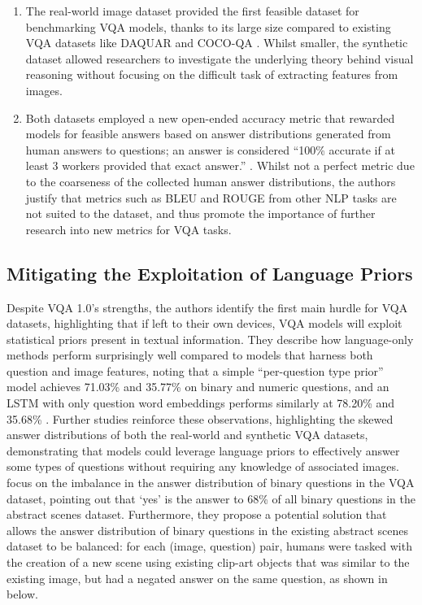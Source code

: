 \begin{enumerate}
    \item The real-world image dataset provided the first feasible dataset for benchmarking VQA models, thanks to its large size compared to existing VQA datasets like DAQUAR \cite{malinowski2014multiworld} and COCO-QA \cite{ren2015exploring}. Whilst smaller, the synthetic dataset allowed researchers to investigate the underlying theory behind visual reasoning without focusing on the difficult task of extracting features from images.
    \item Both datasets employed a new open-ended accuracy metric that rewarded models for feasible answers based on answer distributions generated from human answers to questions; an answer is considered ``100\% accurate if at least 3 workers provided that exact answer.'' \citeauthor{antol2015vqa}. Whilst not a perfect metric due to the coarseness of the collected human answer distributions, the authors justify that metrics such as BLEU and ROUGE from other NLP tasks are not suited to the dataset, and thus promote the importance of further research into new metrics for VQA tasks.
\end{enumerate}


\subsection{Mitigating the Exploitation of Language Priors} 

Despite VQA 1.0's strengths, the authors identify the first main hurdle for VQA datasets, highlighting that if left to their own devices, VQA models will exploit statistical priors present in textual information. They describe how language-only methods perform surprisingly well compared to models that harness both question and image features, noting that a simple ``per-question type prior'' model achieves 71.03\% and 35.77\% on binary and numeric questions, and an LSTM with only question word embeddings performs similarly at 78.20\% and 35.68\%  \cite{antol2015vqa}. Further studies \cite{goyal2017making, zhang2016yin} reinforce these observations, highlighting the skewed answer distributions of both the real-world and synthetic VQA datasets, demonstrating that models could leverage language priors to effectively answer some types of questions without requiring any knowledge of associated images. \citeauthor{zhang2016yin} focus on the imbalance in the answer distribution of binary questions in the VQA dataset, pointing out that `yes' is the answer to 68\% of all binary questions in the abstract scenes dataset. Furthermore, they propose a potential solution that allows the answer distribution of binary questions in the existing abstract scenes dataset to be balanced: for each (image, question) pair, humans were tasked with the creation of a new scene using existing clip-art objects \cite{zitnick2013bringing} that was similar to the existing image, but had a negated answer on the same question, as shown in \figureautorefname{  \ref{fig:zhang2016yin_balancing_procedure}} below.


